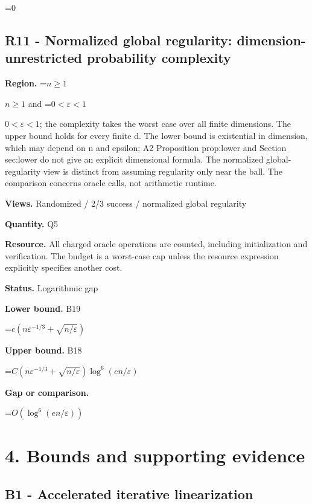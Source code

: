 \documentclass[10pt,a4paper]{article}
\newcommand{\AtlasMath}[1]{\par\begingroup\centering\setbox0=\hbox{$\displaystyle #1$}\ifdim\wd0>1.4\linewidth\typeout{ATLAS WIDE FORMULA: \the\wd0}\fi\ifdim\wd0>\linewidth\resizebox{\linewidth}{!}{\box0}\else\box0\fi\par\endgroup}
\newcommand{\AtlasInlineMath}[1]{\begingroup\setbox0=\hbox{$#1$}\ifdim\wd0>.4\linewidth\endgroup\AtlasMath{#1}\else\endgroup$#1$\fi}
\begin{document}
\AtlasMath{0}


\subsection{R11 - Normalized global regularity: dimension-unrestricted probability complexity}


\textbf{Region.} \AtlasInlineMath{n\ge1} and \AtlasInlineMath{0<\varepsilon<1}; the complexity takes the worst case over all finite dimensions. The upper bound holds for every finite d. The lower bound is existential in dimension, which may depend on n and epsilon; A2 Proposition prop:lower and Section sec:lower do not give an explicit dimensional formula. The normalized global-regularity view is distinct from assuming regularity only near the ball. The comparison concerns oracle calls, not arithmetic runtime.



\textbf{Views.} Randomized / 2/3 success / normalized global regularity



\textbf{Quantity.} Q5



\textbf{Resource.} All charged oracle operations are counted, including initialization and verification. The budget is a worst-case cap unless the resource expression explicitly specifies another cost.



\textbf{Status.} Logarithmic gap



\textbf{Lower bound.} B19



\AtlasMath{c(n\varepsilon^{-1/3}+\sqrt{n/\varepsilon})}


\textbf{Upper bound.} B18



\AtlasMath{C(n\varepsilon^{-1/3}+\sqrt{n/\varepsilon})\log^6(en/\varepsilon)}


\textbf{Gap or comparison.}



\AtlasMath{O(\log^6(en/\varepsilon))}


\section{4. Bounds and supporting evidence}


\subsection{B1 - Accelerated iterative linearization}
\end{document}
